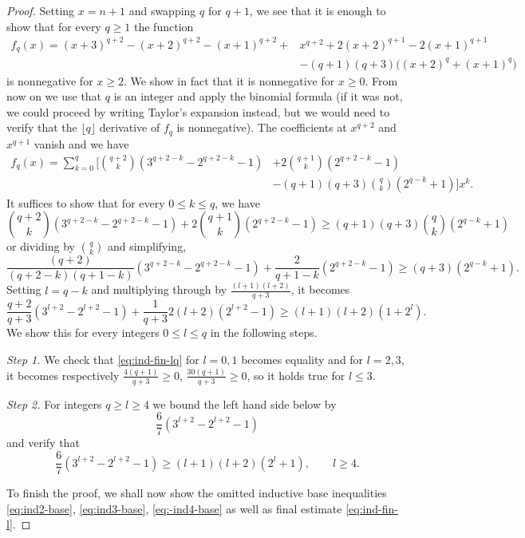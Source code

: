 \documentclass[10pt]{article}
\newcommand{\1}{\textbf{1}}
\theoremstyle{remark}
\theoremstyle{definition}
\begin{document}
\begin{proof}
Setting $x = n+1$ and swapping $q$ for $q+1$, we see that it is enough to show that for every $q \geq 1$ the function
\begin{align*}
f_q(x) = (x+3)^{q+2} - (x+2)^{q+2} -(x+1)^{q+2} + &x^{q+2} + 2(x+2)^{q+1} - 2(x+1)^{q+1} \\
&- (q+1)(q+3)\Big((x+2)^q+(x+1)^q\Big)
\end{align*}
is nonnegative for $x \geq 2$. We show in fact that it is nonnegative for $x \geq 0$. From now on we use that $q$ is an integer and apply the binomial formula (if it was not, we could proceed by writing Taylor's expansion instead, but we would need to verify that the $\lfloor q \rfloor$ derivative of $f_q$ is nonnegative). The coefficients at $x^{q+2}$ and $x^{q+1}$ vanish and we have
\begin{align*}
f_q(x) = \sum_{k=0}^{q} \Bigg[ \binom{q+2}{k}(3^{q+2-k} - 2^{q+2-k}-1) &+ 2\binom{q+1}{k}(2^{q+2-k} - 1) \\
&- (q+1)(q+3)\binom{q}{k}(2^{q-k}+1) \Bigg]x^k.
\end{align*}
It suffices to show that for every $0 \leq k \leq q$, we have
\[
\binom{q+2}{k}(3^{q+2-k} - 2^{q+2-k}-1) + 2\binom{q+1}{k}(2^{q+2-k} - 1) \geq (q+1)(q+3)\binom{q}{k}(2^{q-k}+1)
\]
or dividing by $\binom{q}{k}$ and simplifying,
\[
\frac{(q+2)}{(q+2-k)(q+1-k)}(3^{q+2-k} - 2^{q+2-k}-1) + \frac{2}{q+1-k}(2^{q+2-k} - 1) \geq (q+3)(2^{q-k}+1).
\]
Setting $l = q - k$ and multiplying through by $\frac{(l+1)(l+2)}{q+3}$, it becomes 
\begin{equation}\label{eq:ind-fin-lq}
\frac{q+2}{q+3}(3^{l+2} - 2^{l+2}-1) + \frac{1}{q+3}2(l+2)(2^{l+2} - 1) \geq (l+1)(l+2)(1+2^{l}).
\end{equation}
We show this for every integers $0 \leq l \leq q$ in the following steps.

\bigskip\noindent
\emph{Step 1.} We check that \eqref{eq:ind-fin-lq} for $l = 0, 1$ becomes equality and for $l = 2, 3$, it becomes respectively $\frac{4(q+1)}{q+3} \geq 0$, $\frac{30(q+1)}{q+3} \geq 0$, so it holds true for $l \leq 3.$

\bigskip\noindent
\emph{Step 2.} For integers $q \geq l \geq 4$ we bound the left hand side below by
\[
\frac{6}{7}(3^{l+2}-2^{l+2}-1)
\]
and verify that
\begin{equation}\label{eq:ind-fin-l}
\frac{6}{7}(3^{l+2}-2^{l+2}-1) \geq (l+1)(l+2)(2^l+1), \qquad l \geq 4.
\end{equation}

To finish the proof, we shall now show the omitted inductive base inequalities \eqref{eq:ind2-base}, \eqref{eq:ind3-base}, \eqref{eq:-ind4-base} as well as final estimate \eqref{eq:ind-fin-l}.
\end{proof}
\end{document}
